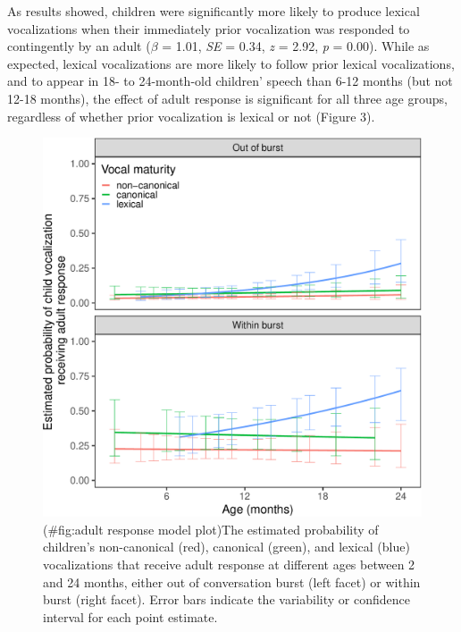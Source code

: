 \documentclass[
  man]{apa6}
\begin{document}
As results showed, children were significantly more likely to produce lexical vocalizations when their immediately prior vocalization was responded to contingently by an adult (\(\beta\) = 1.01, \emph{SE} = 0.34, \emph{z} = 2.92, \emph{p} = 0.00). While as expected, lexical vocalizations are more likely to follow prior lexical vocalizations, and to appear in 18- to 24-month-old children' speech than 6-12 months (but not 12-18 months), the effect of adult response is significant for all three age groups, regardless of whether prior vocalization is lexical or not (Figure 3).

\begin{figure}
\centering
\includegraphics{turntaking_paper_files/figure-latex/adult response model plot-1.pdf}
\caption{(\#fig:adult response model plot)The estimated probability of children's non-canonical (red), canonical (green), and lexical (blue) vocalizations that receive adult response at different ages between 2 and 24 months, either out of conversation burst (left facet) or within burst (right facet). Error bars indicate the variability or confidence interval for each point estimate.}
\end{figure}
\end{document}
